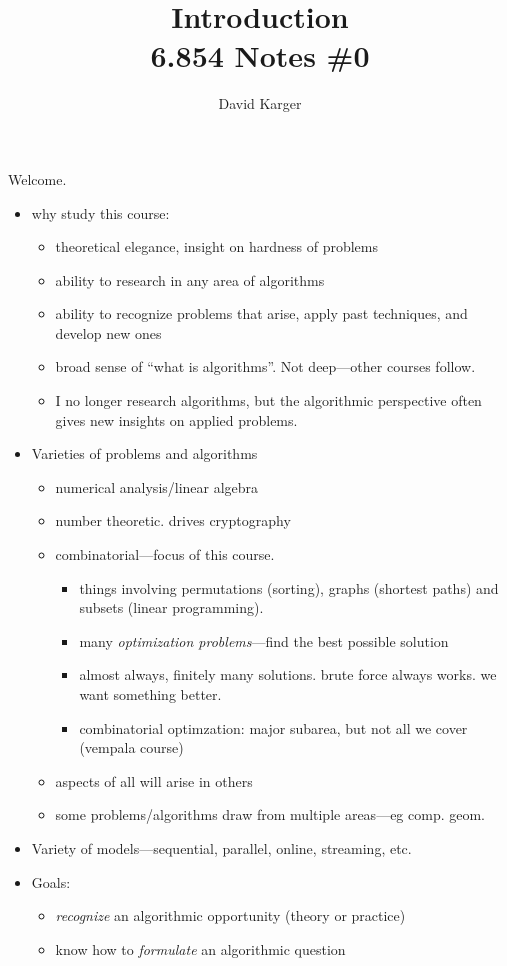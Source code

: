 \documentclass{article}
\title{Introduction\\ 6.854 Notes \#0}
\author{David Karger}
\begin{document}
Welcome.
\begin{itemize}
\item why study this course:
  \begin{itemize}
  \item theoretical elegance, insight on hardness of problems
  \item ability to research in any area of algorithms
  \item ability to recognize problems that arise, apply past techniques,
    and develop new ones
  \item broad sense of ``what is algorithms''.  Not deep---other
    courses follow.
  \item I no longer research algorithms, but the algorithmic perspective often gives new insights on applied problems.
  \end{itemize}
\item Varieties of problems and algorithms
  \begin{itemize}
  \item numerical analysis/linear algebra
  \item number theoretic.  drives cryptography
  \item combinatorial---focus of this course.
    \begin{itemize}
    \item things involving permutations (sorting), graphs (shortest paths)
      and subsets (linear programming).
    \item many {\em optimization problems}---find the best possible
      solution
    \item almost always, finitely many solutions.  brute force always
      works.  we want something better.
    \item combinatorial optimzation: major subarea, but not all we cover
      (vempala course)
    \end{itemize}
  \item aspects of all will arise in others
  \item some problems/algorithms draw from multiple areas---eg comp. geom.
  \end{itemize}
\item Variety of models---sequential, parallel, online, streaming,
  etc.
\item Goals:
  \begin{itemize}
  \item \emph{recognize} an algorithmic opportunity (theory or practice)
  \item know how to \emph{formulate} an algorithmic question

\end{itemize}
\end{itemize}
\end{document}
